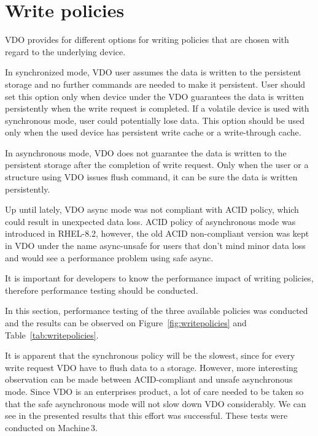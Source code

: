\documentclass[
  color, %
  table, %
  lof,   %
  lot,   %
]{fithesis3}
\begin{document}
\clearpage

\section{Write policies}
VDO provides for different options for writing policies that are chosen with regard to the underlying device. 

In synchronized mode, VDO user assumes the data is written to the persistent storage and no further commands are needed to make it persistent. User should set this option only when device under the VDO guarantees the data is written persistently when the write request is completed. If a volatile device is used with synchronous mode, user could potentially lose data. This option should be used only when the used device has persistent write cache or a write-through cache.

In asynchronous mode, VDO does not guarantee the data is written to the persistent storage after the completion of write request. Only when the user or a structure using VDO issues flush command, it can be sure the data is written persistently.

Up until lately, VDO async mode was not compliant with ACID policy, which could result in unexpected data loss. ACID policy of asynchronous mode was introduced in RHEL-8.2, however, the old ACID non-compliant version was kept in VDO under the name async-unsafe for users that don't mind minor data loss and would see a performance problem using safe async.

It is important for developers to know the performance impact of writing policies, therefore performance testing should be conducted.

In this section, performance testing of the three available policies was conducted and the results can be observed on Figure~\ref{fig:writepolicies} and Table~\ref{tab:writepolicies}.

It is apparent that the synchronous policy will be the slowest, since for every write request VDO have to flush data to a storage. However, more interesting observation can be made between ACID-compliant and unsafe asynchronous mode. Since VDO is an enterprises product, a lot of care needed to be taken so that the safe asynchronous mode will not slow down VDO considerably. We can see in the presented results that this effort was successful. These tests were conducted on Machine\,3.
\end{document}
